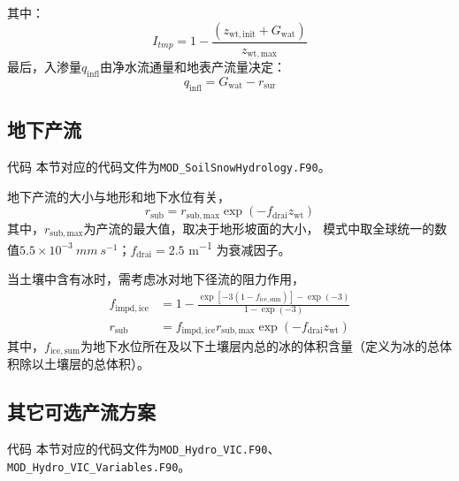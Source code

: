 其中：
\begin{equation}
{I}_{tmp} = 1 - \frac{\left( z_{\mathrm{wt,init}} + {G}_{\mathrm{wat}} \right)}{z_{\mathrm{wt,max}}}
\end{equation}
最后，入渗量$q_{\mathrm{infl}}$由净水流通量和地表产流量决定：
\begin{equation}
  q_{\mathrm{infl}}={G}_{\mathrm{wat}}-r_{\mathrm{sur}}
\end{equation}






\subsection{地下产流} \label{section:rsub_par}
\begin{mymdframed}{代码}
  本节对应的代码文件为\texttt{MOD\_SoilSnowHydrology.F90}。
\end{mymdframed}

地下产流的大小与地形和地下水位有关\citep{niu2005simple}，
\begin{equation}
  r_{\mathrm{sub}} = r_{\mathrm{sub,max}} \exp \left(-f_{\mathrm{drai}}  z_{\mathrm{wt}}\right)
\end{equation}
其中，$r_{\mathrm{sub,max}}$为产流的最大值，取决于地形坡面的大小，
模式中取全球统一的数值$5.5\times 10^{-3}~\unit{mm~s^{-1}}$；$f_{\mathrm{drai}}=2.5$ \unit{m^{-1}} 为衰减因子。

当土壤中含有冰时，需考虑冰对地下径流的阻力作用，
\begin{equation}
  \begin{aligned}
    f_{\mathrm{impd,ice}} & = 1 - \frac{\exp \left[-3 \left(1-f_{\mathrm{ice,sum}}\right)\right]
    -\exp (-3)}{1-\exp (-3)} \\
    r_{\mathrm{sub}} & = f_{\mathrm{impd,ice}}  r_{\mathrm{sub,max}}
    \exp \left(-f_{\mathrm{drai}}  z_{\mathrm{wt}}\right)
  \end{aligned}
\end{equation}
其中，$f_{\mathrm{ice,sum}}$为地下水位所在及以下土壤层内总的冰的体积含量（定义为冰的总体积除以土壤层的总体积）。

\subsection{其它可选产流方案}
\begin{mymdframed}{代码}
  本节对应的代码文件为\texttt{MOD\_Hydro\_VIC.F90}、\texttt{MOD\_Hydro\_VIC\_Variables.F90}。
\end{mymdframed}

